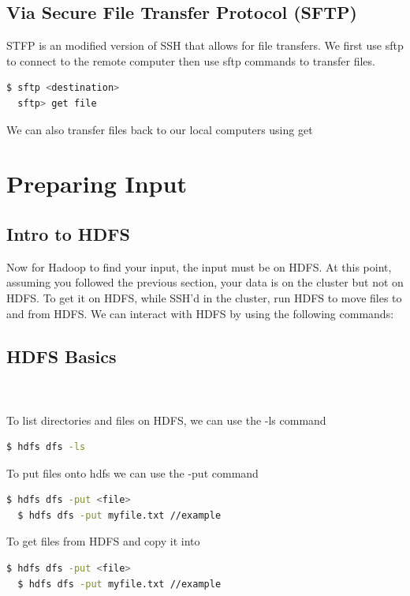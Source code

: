 \documentclass{article}
\begin{document}
\subsection{Via Secure File Transfer Protocol (SFTP)}
STFP is an modified version of SSH that allows for file transfers. We first use sftp to connect to the remote computer then use sftp commands to transfer files.
\begin{lstlisting}[language=bash]
  $ sftp <destination>
  sftp> get file
\end{lstlisting}
We can also transfer files back to our local computers using get


\section{Preparing Input}

\subsection{Intro to HDFS}
Now for Hadoop to find your input, the input must be on HDFS. At this point, assuming you followed the previous section, your data is on the cluster but not on HDFS. To get it on HDFS, while SSH'd in the cluster, run HDFS to move files to and from HDFS.
We can interact with HDFS by using the following commands:

\subsection{HDFS Basics}
\-\\\\\noindent To list directories and files on HDFS, we can use the -ls command
\begin{lstlisting}[language=bash]
  $ hdfs dfs -ls 
\end{lstlisting}
To put files onto hdfs we can use the -put command
\begin{lstlisting}[language=bash]
  $ hdfs dfs -put <file>
  $ hdfs dfs -put myfile.txt //example
\end{lstlisting}
To get files from HDFS and copy it into 
\begin{lstlisting}[language=bash]
  $ hdfs dfs -put <file>
  $ hdfs dfs -put myfile.txt //example
\end{lstlisting}
\end{document}
